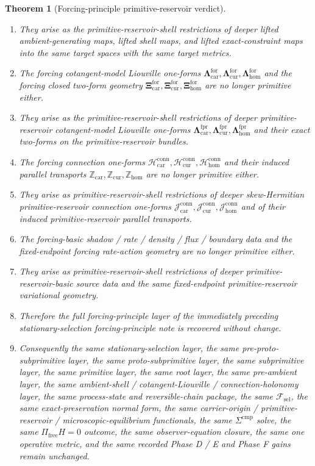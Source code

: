 \documentclass[11pt]{article}
\newcommand{\StemFunctional}{\mathscr F_{\mathrm{sel}}}
\newcommand{\Car}{\mathrm{car}}
\newcommand{\Cur}{\mathrm{cur}}
\newcommand{\Hom}{\mathrm{hom}}
\newcommand{\ForLiouville}[1]{\boldsymbol{\Lambda}_{#1}^{\mathrm{for}}}
\newcommand{\ForTwo}[1]{\boldsymbol{\Xi}_{#1}^{\mathrm{for}}}
\newcommand{\ForConnectionForm}[1]{\mathcal H_{#1}^{\mathrm{conn}}}
\newcommand{\ForTransport}[1]{\mathbb Z_{#1}}
\newcommand{\ForPrimLiouville}[1]{\boldsymbol{\Lambda}_{#1}^{\mathrm{fpr}}}
\newcommand{\ForPrimConnectionForm}[1]{\mathcal J_{#1}^{\mathrm{conn}}}
\newtheorem{theorem}{Theorem}
\begin{document}
\begin{theorem}[Forcing-principle primitive-reservoir verdict]
\begin{enumerate}
    \item They arise as the primitive-reservoir-shell restrictions of deeper lifted ambient-generating maps, lifted shell maps, and lifted exact-constraint maps into the same target spaces with the same target metrics.
    \item The forcing cotangent-model Liouville one-forms \(\ForLiouville{\Car},\ForLiouville{\Cur},\ForLiouville{\Hom}\) and the forcing closed two-form geometry \(\ForTwo{\Car},\ForTwo{\Cur},\ForTwo{\Hom}\) are no longer primitive either.
    \item They arise as the primitive-reservoir-shell restrictions of deeper primitive-reservoir cotangent-model Liouville one-forms \(\ForPrimLiouville{\Car},\ForPrimLiouville{\Cur},\ForPrimLiouville{\Hom}\) and their exact two-forms on the primitive-reservoir bundles.
    \item The forcing connection one-forms \(\ForConnectionForm{\Car},\ForConnectionForm{\Cur},\ForConnectionForm{\Hom}\) and their induced parallel transports \(\ForTransport{\Car},\ForTransport{\Cur},\ForTransport{\Hom}\) are no longer primitive either.
    \item They arise as primitive-reservoir-shell restrictions of deeper skew-Hermitian primitive-reservoir connection one-forms \(\ForPrimConnectionForm{\Car},\ForPrimConnectionForm{\Cur},\ForPrimConnectionForm{\Hom}\) and of their induced primitive-reservoir parallel transports.
    \item The forcing-basic shadow / rate / density / flux / boundary data and the fixed-endpoint forcing rate-action geometry are no longer primitive either.
    \item They arise as primitive-reservoir-shell restrictions of deeper primitive-reservoir-basic source data and the same fixed-endpoint primitive-reservoir variational geometry.
    \item Therefore the full forcing-principle layer of the immediately preceding stationary-selection forcing-principle note is recovered without change.
    \item Consequently the same stationary-selection layer, the same pre-proto-subprimitive layer, the same proto-subprimitive layer, the same subprimitive layer, the same primitive layer, the same root layer, the same pre-ambient layer, the same ambient-shell / cotangent-Liouville / connection-holonomy layer, the same process-state and reversible-chain package, the same \(\StemFunctional\), the same exact-preservation normal form, the same carrier-origin / primitive-reservoir / microscopic-equilibrium functionals, the same \(\Sigma^{\mathrm{cmp}}\) solve, the same \(\Pi_{\mathrm{free}}H=0\) outcome, the same observer-equation closure, the same one operative metric, and the same recorded Phase D / E and Phase F gains remain unchanged.

\end{enumerate}
\end{theorem}
\end{document}
